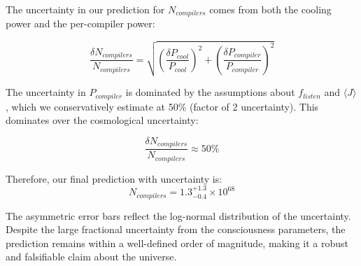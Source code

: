 \documentclass[11pt,a4paper]{article}
\theoremstyle{definition}
\theoremstyle{remark}
\begin{document}
The uncertainty in our prediction for \(N_{compilers}\) comes from both the cooling power and the per-compiler power:

\begin{equation}
    \frac{\delta N_{compilers}}{N_{compilers}} = \sqrt{\left(\frac{\delta P_{cool}}{P_{cool}}\right)^2 + \left(\frac{\delta P_{compiler}}{P_{compiler}}\right)^2}
\end{equation}

The uncertainty in \(P_{compiler}\) is dominated by the assumptions about \(f_{listen}\) and \(\langle J \rangle\), which we conservatively estimate at 50\% (factor of 2 uncertainty). This dominates over the cosmological uncertainty:

\begin{equation}
    \frac{\delta N_{compilers}}{N_{compilers}} \approx 50\%
\end{equation}

Therefore, our final prediction with uncertainty is:
\begin{equation}
    N_{compilers} = 1.3_{-0.4}^{+1.3} \times 10^{68}
\end{equation}

The asymmetric error bars reflect the log-normal distribution of the uncertainty. Despite the large fractional uncertainty from the consciousness parameters, the prediction remains within a well-defined order of magnitude, making it a robust and falsifiable claim about the universe.
\end{document}
